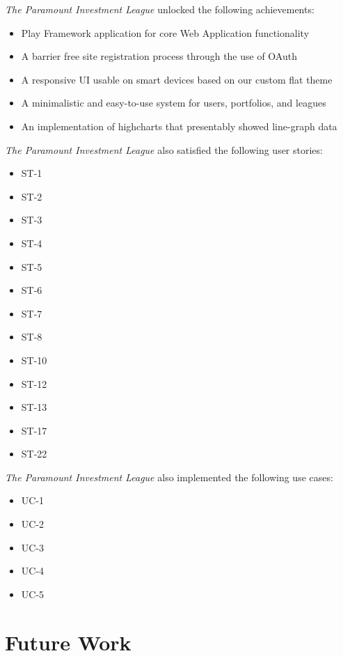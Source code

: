 \textit{The Paramount Investment League} unlocked the following achievements:\\

\begin{itemize}
\item{Play Framework application for core Web Application functionality}
\item{A barrier free site registration process through the use of OAuth}
\item{A responsive UI usable on smart devices based on our custom flat theme}
\item{A minimalistic and easy-to-use system for users, portfolios, and leagues}
\item{An implementation of highcharts that presentably showed line-graph data }
\end{itemize}

\textit{The Paramount Investment League} also satisfied the following user stories:\\

\begin{itemize}
\item{ST-1}
\item{ST-2}
\item{ST-3}
\item{ST-4}
\item{ST-5}
\item{ST-6}
\item{ST-7}
\item{ST-8}
\item{ST-10}
\item{ST-12}
\item{ST-13}
\item{ST-17}
\item{ST-22}
\end{itemize}

\textit{The Paramount Investment League} also implemented the following use cases:\\

\begin{itemize}
\item{UC-1}
\item{UC-2}
\item{UC-3}
\item{UC-4}
\item{UC-5}
\end{itemize}

\section{Future Work}

